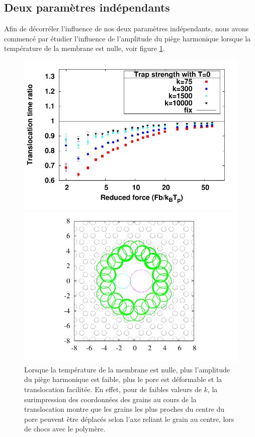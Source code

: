 \newpage

\subsection{Deux paramètres indépendants}


Afin de décorréler l'influence de nos deux paramètres indépendants, nous avons commencé par étudier l'influence de l'amplitude du piège harmonique lorsque la température de la membrane est nulle, voir figure \ref{influencek}.

\begin{figure}[H]
\includegraphics[width=\textwidth]{compkt0.pdf}
\begin{minipage}{0.63\linewidth}
\includegraphics[width=\textwidth]{poreareanotempknorm.pdf}
\end{minipage}
\begin{minipage}{0.37\linewidth} 
\caption[Influence de l'amplitude du piège harmonique]{Lorsque la température de la membrane est nulle, plus l'amplitude du piège harmonique est faible, plus le pore est déformable et la translocation facilitée. En effet, pour de faibles valeurs de $k$, la surimpression des coordonnées des grains au cours de la translocation montre que les grains les plus proches du centre du pore peuvent être déplacés selon l'axe reliant le grain au centre, lors de chocs avec le polymère.}
\label{influencek}
\end{minipage}
\end{figure}

